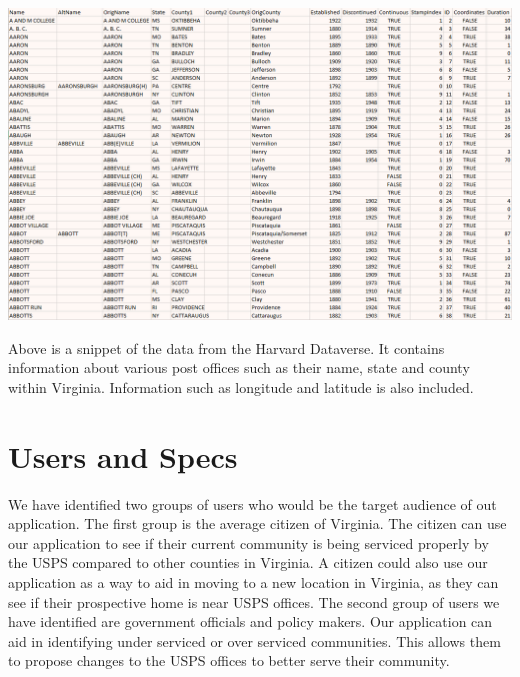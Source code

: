 \documentclass[11pt]{article}
\begin{document}
\begin{center}
\includegraphics[width=1.0\linewidth]{sample.PNG}
\par
\end{center}

Above is a snippet of the data from the Harvard Dataverse. It contains information about various post offices such as their name, state and county within Virginia. Information such as longitude and latitude is also included.
\section*{Users and Specs}



We have identified two groups of users who would be the target audience of out application. The first group is the average citizen of Virginia. The citizen can use our application to see if their current community is being serviced properly by the USPS compared to other counties in Virginia. A citizen could also use our application as a way to aid in moving to a new location in Virginia, as they can see if their prospective home is near USPS offices. The second group of users we have identified are government officials and policy makers. Our application can aid in identifying under serviced or over serviced communities. This allows them to propose changes to the USPS offices to better serve their community.
\end{document}
